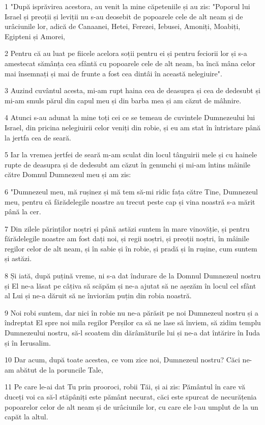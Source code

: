 \par 1 "După isprăvirea acestora, au venit la mine căpeteniile și au zis: "Poporul lui Israel și preoții și leviții nu s-au deosebit de popoarele cele de alt neam și de urâciunile lor, adică de Canaanei, Hetei, Ferezei, Iebusei, Amoniți, Moabiți, Egipteni și Amorei,
\par 2 Pentru că au luat pe fiicele acelora soții pentru ei și pentru feciorii lor și s-a amestecat sămânța cea sfântă cu popoarele cele de alt neam, ba încă mâna celor mai însemnați și mai de frunte a fost cea dintâi în această nelegiuire".
\par 3 Auzind cuvântul acesta, mi-am rupt haina cea de deasupra și cea de dedesubt și mi-am smuls părul din capul meu și din barba mea și am căzut de mâhnire.
\par 4 Atunci s-au adunat la mine toți cei ce se temeau de cuvintele Dumnezeului lui Israel, din pricina nelegiuirii celor veniți din robie, și eu am stat în întristare până la jertfa cea de seară.
\par 5 Iar la vremea jertfei de seară m-am sculat din locul tânguirii mele și cu hainele rupte de deasupra și de dedesubt am căzut în genunchi și mi-am întins mâinile către Domnul Dumnezeul meu și am zis:
\par 6 "Dumnezeul meu, mă rușinez și mă tem să-mi ridic fața către Tine, Dumnezeul meu, pentru că fărădelegile noastre au trecut peste cap și vina noastră s-a mărit până la cer.
\par 7 Din zilele părinților noștri și până astăzi suntem în mare vinovăție, și pentru fărădelegile noastre am fost dați noi, și regii noștri, și preoții noștri, în mâinile regilor celor de alt neam, și în sabie și în robie, și pradă și în rușine, cum suntem și astăzi.
\par 8 Și iată, după puțină vreme, ni s-a dat îndurare de la Domnul Dumnezeul nostru și El ne-a lăsat pe câțiva să scăpăm și ne-a ajutat să ne așezăm în locul cel sfânt al Lui și ne-a dăruit să ne înviorăm puțin din robia noastră.
\par 9 Noi robi suntem, dar nici în robie nu ne-a părăsit pe noi Dumnezeul nostru și a îndreptat El spre noi mila regilor Perșilor ca să ne lase să înviem, să zidim templu Dumnezeului nostru, să-l scoatem din dărâmăturile lui și ne-a dat întărire în Iuda și în Ierusalim.
\par 10 Dar acum, după toate acestea, ce vom zice noi, Dumnezeul nostru? Căci ne-am abătut de la poruncile Tale,
\par 11 Pe care le-ai dat Tu prin prooroci, robii Tăi, și ai zis: Pământul în care vă duceți voi ca să-l stăpâniți este pământ necurat, căci este spurcat de necurățenia popoarelor celor de alt neam și de urâciunile lor, cu care ele l-au umplut de la un capăt la altul.
